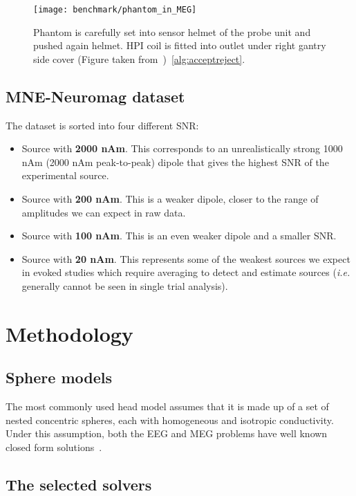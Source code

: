 \begin{figure}[tb]
   \centering
\texttt{[image: benchmark/phantom\_in\_MEG]}
\caption{Phantom is carefully set into sensor helmet of the probe unit and pushed again helmet. HPI coil is fitted into outlet under right gantry side cover (Figure taken from~\cite{hazim2015magnetoencephalography})~\ref{alg:acceptreject}.}
   \label{fig:phantom_in_MEG}
\end{figure}


\subsection{MNE-Neuromag dataset} \label{data:used_data}

The dataset is sorted into four different SNR:
\begin{itemize}
\item Source with \textbf{2000 nAm}. This corresponds to an unrealistically strong 1000 nAm (2000 nAm peak-to-peak) dipole that gives the highest SNR of the experimental source.
\item Source with \textbf{200 nAm}. This is a weaker dipole, closer to the range of amplitudes we can expect in raw data.
\item Source with \textbf{100 nAm}. This is an even weaker dipole and a smaller SNR.
\item Source with \textbf{20 nAm}. This represents some of the weakest sources we expect in evoked studies which require averaging to detect and estimate sources (\textit{i.e.} generally cannot be seen in single trial analysis).
\end{itemize}

\section{Methodology}

\subsection{Sphere models}
The most commonly used head model assumes that it is made up of a set of nested concentric spheres, each with homogeneous and isotropic conductivity. Under this assumption, both the EEG and MEG problems have well known closed form solutions~\cite{mosher1999eeg}.

\subsection{The selected solvers}
